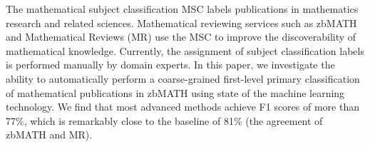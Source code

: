 The mathematical subject classification MSC labels publications in mathematics research and related sciences.
Mathematical reviewing services such as zbMATH and Mathematical Reviews (MR) use the MSC to improve the discoverability of mathematical knowledge.
Currently, the assignment of subject classification labels is performed manually by domain experts.
In this paper, we investigate the ability to automatically perform a coarse-grained first-level primary classification of mathematical publications in zbMATH using state of the machine learning technology.
We find that most advanced methods achieve F1 scores of more than 77\%, which is remarkably close to the baseline of 81\% (the agreement of zbMATH and MR).